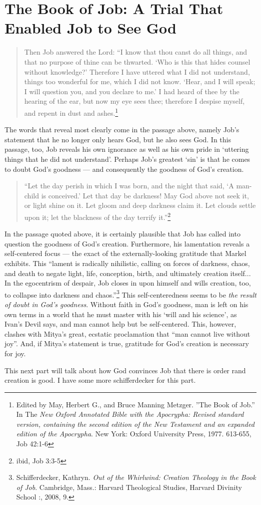 	\section{The Book of Job: A Trial That Enabled Job to See God}
	\begin{quote}
	\onehalfspacing
	Then Job answered the Lord: ``I know that thou canst do all things, and that no purpose of thine can be thwarted. `Who is this that hides counsel without knowledge?' Therefore I have uttered what I did not understand, things too wonderful for me, which I did not know. `Hear, and I will speak; I will question you, and you declare to me.' I had heard of thee by the hearing of the ear, but now my eye sees thee; therefore I despise myself, and repent in dust and ashes.\footnote{Edited by May, Herbert G., and Bruce Manning Metzger. ''The Book of Job.'' In The \emph{New Oxford Annotated Bible with the Apocrypha: Revised standard version, containing the second edition of the New Testament and an expanded edition of the Apocrypha}. New York: Oxford University Press, 1977. 613-655, Job 42:1-6} 
	\end{quote}

	The words that reveal most clearly come in the passage above, namely Job's statement that he no longer only hears God, but he also sees God. In this passage, too, Job reveals his own ignorance as well as his own pride in `uttering things that he did not understand'. Perhaps Job's greatest `sin' is that he comes to doubt God's goodness --- and consequently the goodness of God's creation. 
	
	\begin{quote}
	\onehalfspacing
	``Let the day perish in which I was born, and the night that said, `A man-child is conceived.' Let that day be darkness! May God above not seek it, or light shine on it. Let gloom and deep darkness claim it. Let clouds settle upon it; let the blackness of the day terrify it.''\footnote{ibid, Job 3:3-5}
	\end{quote}
	
	In the passage quoted above, it is certainly plausible that Job has called into question the goodness of God's creation. Furthermore, his lamentation reveals a self-centered focus --- the exact of the externally-looking gratitude that Markel exhibits. This ``lament is radically nihilistic, calling on forces of darkness, chaos, and death to negate light, life, conception, birth, and ultimately creation itself... In the egocentrism of despair, Job closes in upon himself and wills creation, too, to collapse into darkness and chaos.''\footnote{Schifferdecker, Kathryn. \emph{Out of the Whirlwind: Creation Theology in the Book of Job}. Cambridge, Mass.: Harvard Theological Studies, Harvard Divinity School :, 2008, 9.} This self-centeredness seems to be \emph{the result of doubt in God's goodness}. Without faith in God's goodness, man is left on his own terms in a world that he must master with his `will and his science', as Ivan's Devil says, and man cannot help but be self-centered. This, however, clashes with Mitya's great, ecstatic proclamation that ``man cannot live without joy''. And, if Mitya's statement is true, gratitude for God's creation is necessary for joy.
	
	This next part will talk about how God convinces Job that there is order rand creation is good. I have some more schifferdecker for this part.
	
	

